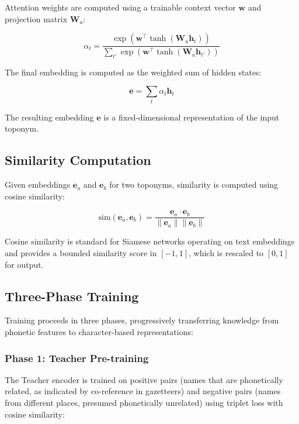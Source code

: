 \documentclass[11pt]{article}
\begin{document}
    Attention weights are computed using a trainable context vector $\mathbf{w}$ and projection matrix $\mathbf{W}_a$:

    \begin{equation}
        \alpha_t = \frac{\exp(\mathbf{w}^\top \tanh(\mathbf{W}_a \mathbf{h}_t))}{\sum_{t'} \exp(\mathbf{w}^\top \tanh(\mathbf{W}_a \mathbf{h}_{t'}))}
    \end{equation}

    The final embedding is computed as the weighted sum of hidden states:

    \begin{equation}
        \mathbf{e} = \sum_t \alpha_t \mathbf{h}_t
    \end{equation}

    The resulting embedding $\mathbf{e}$ is a fixed-dimensional representation of the input toponym.

    \subsection{Similarity Computation}

    Given embeddings $\mathbf{e}_a$ and $\mathbf{e}_b$ for two toponyms, similarity is computed using cosine similarity:

    \begin{equation}
        \text{sim}(\mathbf{e}_a, \mathbf{e}_b) = \frac{\mathbf{e}_a \cdot \mathbf{e}_b}{\|\mathbf{e}_a\| \|\mathbf{e}_b\|}
    \end{equation}

    Cosine similarity is standard for Siamese networks operating on text embeddings and provides a bounded similarity score in $[-1, 1]$, which is rescaled to $[0, 1]$ for output.

    \subsection{Three-Phase Training}

    Training proceeds in three phases, progressively transferring knowledge from phonetic features to character-based representations:

    \subsubsection{Phase 1: Teacher Pre-training}

    The Teacher encoder is trained on positive pairs (names that are phonetically related, as indicated by co-reference in gazetteers) and negative pairs (names from different places, presumed phonetically unrelated) using triplet loss with cosine similarity:
\end{document}
